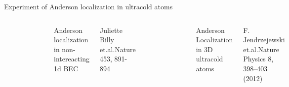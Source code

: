 \documentclass{beamer}
\begin{document}
\begin{frame}{Experiment of Anderson localization in ultracold atoms}
\begin{columns}
\begin{figure}
\includegraphics[width=1\linewidth]{adbec}
\end{figure}
\tiny{Anderson localization in non-intereacting 1d BEC\\~

Juliette Billy et.al.Nature 453, 891-894}
\begin{figure}
\includegraphics[width=1.1\linewidth]{adlat}
\end{figure}
\tiny{Anderson Localization in 3D ultracold atoms\\~

F. Jendrzejewski et.al.Nature Physics 8, 398–403 (2012)}
\end{columns}

\end{frame}
\end{document}
